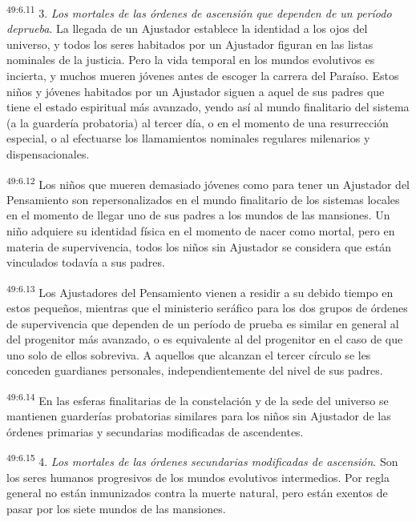 \par
\textsuperscript{49:6.11} 3. \textit{Los mortales de las órdenes de ascensión que dependen de un período deprueba}. La llegada de un Ajustador establece la identidad a los ojos del universo, y todos los seres habitados por un Ajustador figuran en las listas nominales de la justicia. Pero la vida temporal en los mundos evolutivos es incierta, y muchos mueren jóvenes antes de escoger la carrera del Paraíso. Estos niños y jóvenes habitados por un Ajustador siguen a aquel de sus padres que tiene el estado espiritual más avanzado, yendo así al mundo finalitario del sistema (a la guardería probatoria) al tercer día, o en el momento de una resurrección especial, o al efectuarse los llamamientos nominales regulares milenarios y dispensacionales.

\par
\textsuperscript{49:6.12} Los niños que mueren demasiado jóvenes como para tener un Ajustador del Pensamiento son repersonalizados en el mundo finalitario de los sistemas locales en el momento de llegar uno de sus padres a los mundos de las mansiones. Un niño adquiere su identidad física en el momento de nacer como mortal, pero en materia de supervivencia, todos los niños sin Ajustador se considera que están vinculados todavía a sus padres.

\par
\textsuperscript{49:6.13} Los Ajustadores del Pensamiento vienen a residir a su debido tiempo en estos pequeños, mientras que el ministerio seráfico para los dos grupos de órdenes de supervivencia que dependen de un período de prueba es similar en general al del progenitor más avanzado, o es equivalente al del progenitor en el caso de que uno solo de ellos sobreviva. A aquellos que alcanzan el tercer círculo se les conceden guardianes personales, independientemente del nivel de sus padres.

\par
\textsuperscript{49:6.14} En las esferas finalitarias de la constelación y de la sede del universo se mantienen guarderías probatorias similares para los niños sin Ajustador de las órdenes primarias y secundarias modificadas de ascendentes.

\par
\textsuperscript{49:6.15} 4. \textit{Los mortales de las órdenes secundarias modificadas de ascensión}. Son los seres humanos progresivos de los mundos evolutivos intermedios. Por regla general no están inmunizados contra la muerte natural, pero están exentos de pasar por los siete mundos de las mansiones.

